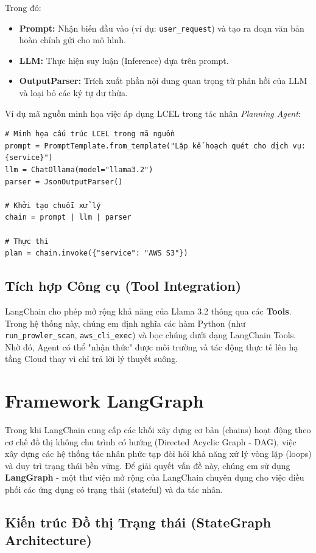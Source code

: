 Trong đó:
\begin{itemize}
    \item \textbf{Prompt:} Nhận biến đầu vào (ví dụ: \texttt{user\_request}) và tạo ra đoạn văn bản hoàn chỉnh gửi cho mô hình.
    \item \textbf{LLM:} Thực hiện suy luận (Inference) dựa trên prompt.
    \item \textbf{OutputParser:} Trích xuất phần nội dung quan trọng từ phản hồi của LLM và loại bỏ các ký tự dư thừa.
\end{itemize}

Ví dụ mã nguồn minh họa việc áp dụng LCEL trong tác nhân \textit{Planning Agent}:

\begin{verbatim}
# Minh họa cấu trúc LCEL trong mã nguồn
prompt = PromptTemplate.from_template("Lập kế hoạch quét cho dịch vụ: {service}")
llm = ChatOllama(model="llama3.2")
parser = JsonOutputParser()

# Khởi tạo chuỗi xử lý
chain = prompt | llm | parser

# Thực thi
plan = chain.invoke({"service": "AWS S3"})
\end{verbatim}

\subsection{Tích hợp Công cụ (Tool Integration)}
LangChain cho phép mở rộng khả năng của Llama 3.2 thông qua các \textbf{Tools}. Trong hệ thống này, chúng em định nghĩa các hàm Python (như \texttt{run\_prowler\_scan}, \texttt{aws\_cli\_exec}) và bọc chúng dưới dạng LangChain Tools. Nhờ đó, Agent có thể "nhận thức" được môi trường và tác động thực tế lên hạ tầng Cloud thay vì chỉ trả lời lý thuyết suông.
\section{Framework LangGraph}

Trong khi LangChain cung cấp các khối xây dựng cơ bản (chains) hoạt động theo cơ chế đồ thị không chu trình có hướng (Directed Acyclic Graph - DAG), việc xây dựng các hệ thống tác nhân phức tạp đòi hỏi khả năng xử lý vòng lặp (loops) và duy trì trạng thái bền vững. Để giải quyết vấn đề này, chúng em sử dụng \textbf{LangGraph} - một thư viện mở rộng của LangChain chuyên dụng cho việc điều phối các ứng dụng có trạng thái (stateful) và đa tác nhân.

\subsection{Kiến trúc Đồ thị Trạng thái (StateGraph Architecture)}

